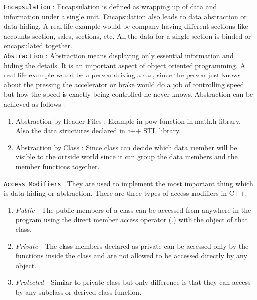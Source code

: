 \documentclass[oops.tex]{subfiles}
\begin{document}
\texttt{Encapsulation} : Encapsulation is defined as wrapping up of data and 
information under a single unit. Encapsulation also leads to data abstraction 
or data hiding. A real life example would be company having different sections 
like accounts section, sales, sections, etc. All the data for a single section is
binded or encapsulated together.\\

\texttt{Abstraction} : Abstraction means displaying only essential information 
and hiding the details. It is an important aspect of object oriented
programming. A real life example would be a person driving a car, since the person 
just knows about the pressing the accelerator or brake would do a job of
controlling speed but how the speed is exactly being controlled he never knows.
Abstraction can be achieved as follows : - 
\begin{enumerate}
    \item Abstraction by Header Files : Example in pow function in math.h library. 
          Also the data structures declared in c++ STL library.
    \item Abstraction by Class : Since class can decide which data member will be
          visible to the outside world since it can group the data members and 
          the member functions together.\\
\end{enumerate}

\texttt{Access Modifiers} : They are used to implement the most important thing
which is data hiding or abstraction. There are three types of access modifiers
in C++.
\begin{enumerate}
    \item \emph{Public} - The public members of a class can be accessed 
          from anywhere in the program using the direct member access operator (.) 
          with the object of that class.
    \item \emph{Private} - The class members declared as private can be accessed 
          only by the functions inside the class and are not allowed to be accessed 
          directly by any object.
    \item \emph{Protected} - Similar to private class but only difference is
          that they can access by any subclass or derived class function.\\
\end{enumerate}
\end{document}
